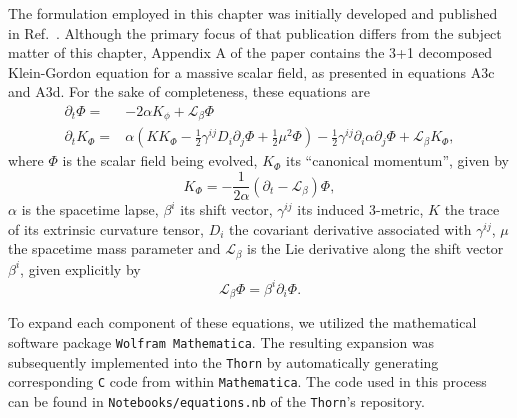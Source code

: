 The formulation employed in this chapter was initially developed and published in Ref.~\cite{PhysRevD.96.104040}. Although the primary focus of that publication differs from the subject matter of this chapter, Appendix A of the paper contains the 3+1 decomposed Klein-Gordon equation for a massive scalar field, as presented in equations A3c and A3d. For the sake of completeness, these equations are
%
\begin{align}
  \partial_t \Phi =   & -2 \alpha K_\phi + \mathcal{L}_\beta \Phi \label{eq:wave_scattering_a3c}                                                                                                                                                     \\
  \partial_t K_\Phi = & \alpha \left( K K_\Phi - \frac{1}{2} \gamma^{ij} D_i \partial_j \Phi + \frac{1}{2} \mu^2 \Phi \right) - \frac{1}{2} \gamma^{ij} \partial_i \alpha \partial_j \Phi + \mathcal{L}_\beta K_\Phi, \label{eq:wave_scattering_a3d}
\end{align}
%
where $\Phi$ is the scalar field being evolved, $K_\Phi$ its ``canonical momentum'', given by
%
\begin{equation}
  K_\Phi = -\frac{1}{2\alpha} \left( \partial_t - \mathcal{L}_\beta \right)\Phi,
  \label{eq:wave_scattering_a2}
\end{equation}
%
$\alpha$ is the spacetime lapse, $\beta^i$ its shift vector, $\gamma^{ij}$ its induced 3-metric, $K$ the trace of its extrinsic curvature tensor, $D_i$ the covariant derivative associated with $\gamma^{ij}$, $\mu$ the spacetime mass parameter and $\mathcal{L}_\beta$ is the Lie derivative along the shift vector $\beta^i$, given explicitly by
%
\begin{equation}
  \mathcal{L}_\beta\Phi = \beta^i \partial_i \Phi.
  \label{eq:wave_scattering_lie_derivative}
\end{equation}

To expand each component of these equations, we utilized the mathematical software package \texttt{Wolfram Mathematica}. The resulting expansion was subsequently implemented into the \texttt{Thorn} by automatically generating corresponding \texttt{C} code from within \texttt{Mathematica}. The code used in this process can be found in \texttt{Notebooks/equations.nb} of the \texttt{Thorn}'s repository.